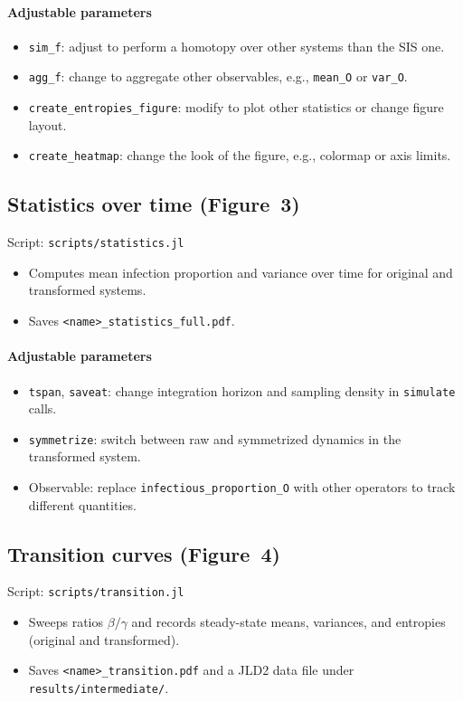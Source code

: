 \documentclass[11pt]{article}
\newcommand{\code}[1]{\texttt{#1}}
\begin{document}
  \paragraph{Adjustable parameters}
  \begin{itemize}
    \item \code{sim\_f}: adjust to perform a homotopy over other systems than the SIS one.
    \item \code{agg\_f}: change to aggregate other observables, e.g., \code{mean\_O} or \code{var\_O}.
    \item \code{create\_entropies\_figure}: modify to plot other statistics or change figure layout.
    \item \code{create\_heatmap}: change the look of the figure, e.g., colormap or axis limits.
  \end{itemize}

\subsection{Statistics over time (Figure~3)}
  Script: \code{scripts/statistics.jl}
  \begin{itemize}
    \item Computes mean infection proportion and variance over time for original and transformed systems.
    \item Saves \code{<name>\_statistics\_full.pdf}.
  \end{itemize}

  \paragraph{Adjustable parameters}
  \begin{itemize}
    \item \code{tspan}, \code{saveat}: change integration horizon and sampling density in \code{simulate} calls.
    \item \code{symmetrize}: switch between raw and symmetrized dynamics in the transformed system.
    \item Observable: replace \code{infectious\_proportion\_O} with other operators to track different quantities.
  \end{itemize}

\subsection{Transition curves (Figure~4)}
  Script: \code{scripts/transition.jl}
  \begin{itemize}
    \item Sweeps ratios \(\beta/\gamma\) and records steady-state means, variances, and entropies (original and transformed).
    \item Saves \code{<name>\_transition.pdf} and a JLD2 data file under \code{results/intermediate/}.
  \end{itemize}
\end{document}
